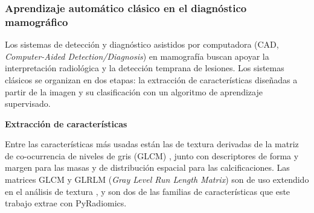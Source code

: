 
\subsubsection{Aprendizaje automático clásico en el diagnóstico mamográfico}

Los sistemas de detección y diagnóstico asistidos por computadora (CAD, \textit{Computer-Aided Detection/Diagnosis}) en mamografía buscan apoyar la interpretación radiológica y la detección temprana de lesiones. Los sistemas clásicos se organizan en dos etapas: la extracción de características diseñadas a partir de la imagen y su clasificación con un algoritmo de aprendizaje supervisado.

\textbf{Extracción de características}

Entre las características más usadas están las de textura derivadas de la matriz de co-ocurrencia de niveles de gris (GLCM) \cite{TandFOnline2021}, junto con descriptores de forma y margen para las masas y de distribución espacial para las calcificaciones.
Las matrices GLCM y GLRLM (\textit{Gray Level Run Length Matrix}) son de uso extendido en el análisis de textura \cite{Avci2023MammographyEnhancement}, y son dos de las familias de características que este trabajo extrae con PyRadiomics.


